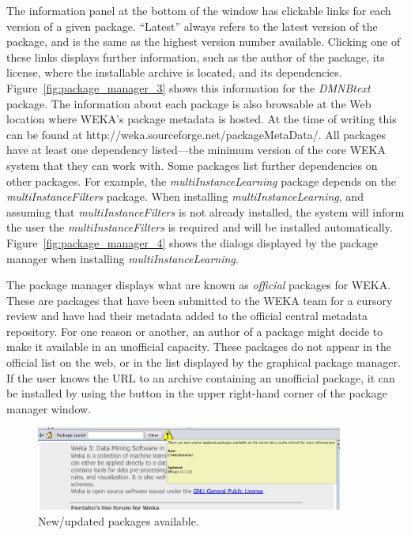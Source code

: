The information panel at the bottom of the window has clickable links
for each version of a given package. ``Latest'' always refers to the
latest version of the package, and is the same as the highest version
number available. Clicking one of these links displays further
information, such as the author of the package, its license, where the
installable archive is located, and its dependencies.
Figure~\ref{fig:package_manager_3} shows this information for
the \textit{DMNBtext} package.  The information about each package is
also browsable at the Web location where WEKA's package metadata is
hosted. At the time of writing this can be found at
http://weka.sourceforge.net/packageMetaData/.  All packages have at
least one dependency listed---the minimum version of the core WEKA
system that they can work with. Some packages list further
dependencies on other packages. For example,
the \textit{multiInstanceLearning} package depends on the
\textit{multiInstanceFilters} package. When installing \textit{multiInstanceLearning},
and assuming that \textit{multiInstanceFilters} is not already
installed, the system will inform the user the \textit{multiInstanceFilters} is
required and will be installed automatically. Figure~\ref{fig:package_manager_4} shows the
dialogs displayed by the package manager when installing
\textit{multiInstanceLearning}.

The package manager displays what are known as \textit{official}
packages for WEKA. These are packages that have been submitted to the
WEKA team for a cursory review and have had their metadata added to
the official central metadata repository. For one reason or another,
an author of a package might decide to make it available in an
unofficial capacity. These packages do not appear in the official list
on the web, or in the list displayed by the graphical package
manager. If the user knows the URL to an archive containing an
unofficial package, it can be installed by using the button in the
upper right-hand corner of the package manager window.

\begin{figure}[!th]
\centering
\includegraphics[width=0.9\textwidth]{images/P5.png}
\caption{New/updated packages available.}
\label{fig:package_manager_5}
\end{figure}

